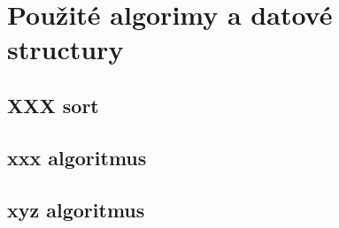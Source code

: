\section{Použité algorimy a datové structury}
\subsection{XXX sort}
\subsection{xxx algoritmus}
\subsection{xyz algoritmus}